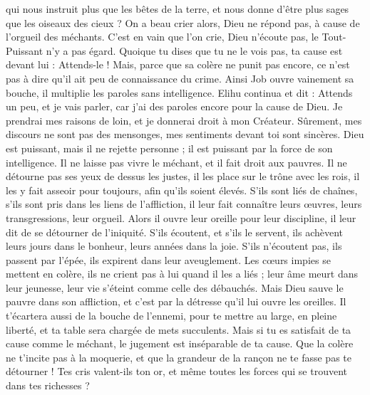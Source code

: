 \begin{multicols}{2}
qui nous instruit plus que les bêtes de la terre, et nous donne d'être plus sages que les oiseaux des cieux ?
On a beau crier alors, Dieu ne répond pas, à cause de l'orgueil des méchants.
C'est en vain que l'on crie, Dieu n'écoute pas, le Tout-Puissant n'y a pas égard.
Quoique tu dises que tu ne le vois pas, ta cause est devant lui : Attends-le !
Mais, parce que sa colère ne punit pas encore, ce n'est pas à dire qu'il ait peu de connaissance du crime.
Ainsi Job ouvre vainement sa bouche, il multiplie les paroles sans intelligence.
\VerseOne{}Elihu continua et dit :
Attends un peu, et je vais parler, car j'ai des paroles encore pour la cause de Dieu.
Je prendrai mes raisons de loin, et je donnerai droit à mon Créateur.
Sûrement, mes discours ne sont pas des mensonges, mes sentiments devant toi sont sincères.
Dieu est puissant, mais il ne rejette personne ; il est puissant par la force de son intelligence.
Il ne laisse pas vivre le méchant, et il fait droit aux pauvres.
Il ne détourne pas ses yeux de dessus les justes, il les place sur le trône avec les rois, il les y fait asseoir pour toujours, afin qu'ils soient élevés.
S'ils sont liés de chaînes, s'ils sont pris dans les liens de l'affliction,
il leur fait connaître leurs œuvres, leurs transgressions, leur orgueil.
Alors il ouvre leur oreille pour leur discipline, il leur dit de se détourner de l'iniquité.
S'ils écoutent, et s'ils le servent, ils achèvent leurs jours dans le bonheur, leurs années dans la joie.
S'ils n'écoutent pas, ils passent par l'épée, ils expirent dans leur aveuglement.
Les cœurs impies se mettent en colère, ils ne crient pas à lui quand il les a liés ;
leur âme meurt dans leur jeunesse, leur vie s'éteint comme celle des débauchés.
Mais Dieu sauve le pauvre dans son affliction, et c'est par la détresse qu'il lui ouvre les oreilles.
Il t'écartera aussi de la bouche de l'ennemi, pour te mettre au large, en pleine liberté, et ta table sera chargée de mets succulents.
Mais si tu es satisfait de ta cause comme le méchant, le jugement est inséparable de ta cause.
Que la colère ne t'incite pas à la moquerie, et que la grandeur de la rançon ne te fasse pas te détourner !
Tes cris valent-ils ton or, et même toutes les forces qui se trouvent dans tes richesses ?

\end{multicols}
